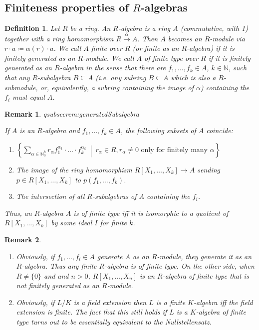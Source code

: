 \documentclass[DIV=14,parskip=full,pointednumbers]{scrartcl}
\newenvironment{alphanumerate}{\begin{enumerate}[label={\upshape(\alph*)},ref=\curthm]}{\end{enumerate}}
\renewenvironment{itemize}{\begin{enumerate}[label={$\bullet$},ref=\curthm]}{\end{enumerate}}
\theoremstyle{cthm}
\theoremstyle{cvarthm}
\theoremstyle{cdef}
\newtheorem{defi}{Definition}[subsection]
\newtheorem{rem}{Remark}[subsection]
\newcommand{\lbl}[1]{
	\label{#1}
	\ifmmode
	\expandafter\xdef\csname eqsubsec#1\endcsname{\thesubsection}
	\fi
}
\newcommand{\IN}{\mathbb{N}}
\newcommand{\longto}{\longrightarrow}
\newcommand{\st}{\ \middle|\ }
\begin{document}
	\subsection{Finiteness properties of \texorpdfstring{$R$}{R}-algebras}
	\begin{defi}
		Let $R$ be a ring. An \emph{$R$-algebra} is a ring $A$ (commutative, with 1) together with a ring homomorphism $R\overset{\alpha}{\longto} A$. Then $A$ becomes an $R$-module via $r\cdot a \coloneqq \alpha(r) \cdot a$. We call $A$ \emph{finite over $R$} (or \emph{finite as an $R$-algebra}) if it is finitely generated as an $R$-module. We call $A$ of \emph{finite type over $R$} if it is finitely generated as an $R$-algebra in the sense that there are $f_1,\ldots, f_k\in A$, $k\in \IN$, such that any $R$-subalgebra $B\subseteq A$ (i.e. any subring $B\subseteq A$ which is also a $R$-submodule, or, equivalently, a subring containing the image of $\alpha$) containing the $f_i$ must equal $A$.
	\end{defi}
	\begin{rem}\lbl{rem:generatedSubalgebra}
		If $A$ is an $R$-algebra and $f_1,\ldots,f_k\in A$, the following subsets of $A$ coincide:
		\begin{itemize}
			\item $\left\{\sum_{\alpha\in\IN_0^k} r_\alpha f_1^{\alpha_1}\cdot\ldots\cdot f_k^{\alpha_k}\st r_\alpha\in R, r_\alpha\neq 0 \text{ only for finitely many } \alpha\right\}$
			\item The image of the ring homomorphism $R[X_1,\ldots,X_k]\to A$ sending $p\in R[X_1,\ldots, X_k]$ to $p(f_1,\ldots,f_k)$.
			\item The intersection of all $R$-subalgebras of $A$ containing the $f_i$.
		\end{itemize}
		Thus, an $R$-algebra $A$ is of finite type iff it is isomorphic to a quotient of $R[X_1,\ldots, X_k]$ by some ideal $I$ for finite $k$.
	\end{rem}
	\begin{rem}
		\begin{alphanumerate}
			\item Obviously, if $f_1,\ldots, f_i\in A$ generate $A$ as an $R$-module, they generate it as an $R$-algebra. Thus any finite $R$-algebra is of finite type. On the other side, when $R\neq \{0\}$ and and $n>0$, $R[X_1, \ldots, X_n]$ is an $R$-algebra of finite type that is not finitely generated as an $R$-module.
			\item Obviously, if $L/K$ is a field extension then $L$ is a finite $K$-algebra iff the field extension is finite. The fact that this still holds if $L$ is a $K$-algebra of finite type turns out to be essentially equivalent to the Nullstellensatz.
		\end{alphanumerate}
		
	\end{rem}
	
\end{document}
